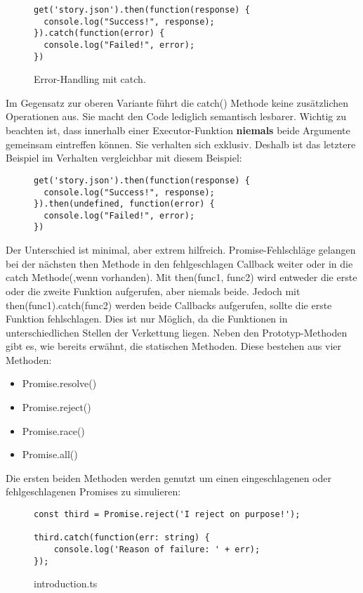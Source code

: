 \begin{figure}[H]
\begin{lstlisting}
get('story.json').then(function(response) {
  console.log("Success!", response);
}).catch(function(error) {
  console.log("Failed!", error);
})
\end{lstlisting}
\caption{Error-Handling mit catch. \cite{callback-vs-promises}}
\end{figure}

\noindent
Im Gegensatz zur oberen Variante führt die catch() Methode keine zusätzlichen Operationen aus. Sie macht den Code lediglich semantisch lesbarer. Wichtig zu beachten ist, dass innerhalb einer Executor-Funktion \textbf{niemals} beide Argumente gemeinsam eintreffen können. Sie verhalten sich exklusiv. Deshalb ist das letztere Beispiel im Verhalten vergleichbar mit diesem Beispiel:

\begin{figure}[H]
\begin{lstlisting}
get('story.json').then(function(response) {
  console.log("Success!", response);
}).then(undefined, function(error) {
  console.log("Failed!", error);
})
\end{lstlisting}
\end{figure}

\noindent
Der Unterschied ist minimal, aber extrem hilfreich. Promise-Fehlschläge gelangen bei der nächsten then Methode in den fehlgeschlagen Callback weiter oder in die catch Methode(,wenn vorhanden). Mit then(func1, func2) wird entweder die erste oder die zweite Funktion aufgerufen, aber niemals beide. Jedoch mit then(func1).catch(func2) werden beide Callbacks aufgerufen, sollte die erste Funktion fehlschlagen. Dies ist nur Möglich, da die Funktionen in unterschiedlichen Stellen der Verkettung liegen. Neben den Prototyp-Methoden gibt es, wie bereits erwähnt, die statischen Methoden. Diese bestehen aus vier Methoden:

\begin{itemize}
\item Promise.resolve()
\item Promise.reject()
\item Promise.race()
\item Promise.all()
\end{itemize}

\noindent
Die ersten beiden Methoden werden genutzt um einen eingeschlagenen oder fehlgeschlagenen Promises zu simulieren:

\begin{figure}[H]
\begin{lstlisting}
const third = Promise.reject('I reject on purpose!');

third.catch(function(err: string) {
    console.log('Reason of failure: ' + err);
});
\end{lstlisting}
\caption{introduction.ts}
\end{figure}

